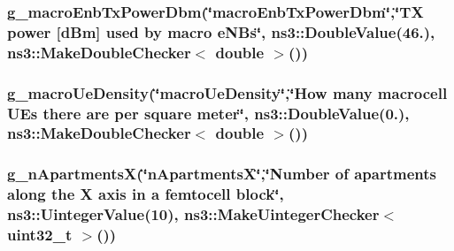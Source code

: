 \subsubsection[{\texorpdfstring{g\+\_\+macro\+Enb\+Tx\+Power\+Dbm}{g_macroEnbTxPowerDbm}}]{ g\+\_\+macro\+Enb\+Tx\+Power\+Dbm(\char`\"{}macro\+Enb\+Tx\+Power\+Dbm\char`\"{},\char`\"{}TX power \mbox{[}{\bf d\+Bm}\mbox{]} used by macro e\+N\+Bs\char`\"{}, ns3\+::\+Double\+Value(46.), {\bf ns3\+::\+Make\+Double\+Checker}$<$ double $>$())\hspace{0.3cm}{\ttfamily [static]}}\hypertarget{lena-dual-stripe_8cc_acf33feb28d1d3f521280889537bc891d}{}\label{lena-dual-stripe_8cc_acf33feb28d1d3f521280889537bc891d}
\subsubsection[{\texorpdfstring{g\+\_\+macro\+Ue\+Density}{g_macroUeDensity}}]{ g\+\_\+macro\+Ue\+Density(\char`\"{}macro\+Ue\+Density\char`\"{},\char`\"{}How many macrocell U\+Es there are per square meter\char`\"{}, ns3\+::\+Double\+Value(0.), {\bf ns3\+::\+Make\+Double\+Checker}$<$ double $>$())\hspace{0.3cm}{\ttfamily [static]}}\hypertarget{lena-dual-stripe_8cc_aa657d06b814d04e5cf6092d1a962ae07}{}\label{lena-dual-stripe_8cc_aa657d06b814d04e5cf6092d1a962ae07}
\subsubsection[{\texorpdfstring{g\+\_\+n\+ApartmentsX}{g_nApartmentsX}}]{ g\+\_\+n\+ApartmentsX(\char`\"{}n\+ApartmentsX\char`\"{},\char`\"{}Number of apartments along the X {\bf axis} in a femtocell block\char`\"{}, ns3\+::\+Uinteger\+Value(10), {\bf ns3\+::\+Make\+Uinteger\+Checker}$<$ uint32\+\_\+t $>$())\hspace{0.3cm}{\ttfamily [static]}}\hypertarget{lena-dual-stripe_8cc_a491818f72e50f3c52632374aa402e712}{}\label{lena-dual-stripe_8cc_a491818f72e50f3c52632374aa402e712}
